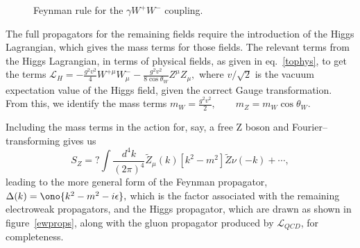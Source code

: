 \begin{figure}[htbp]
\begin{minipage}[b]{.69\textwidth}\centering\footnotesize
{}
\end{minipage}\hfill
\begin{minipage}[b]{.3\textwidth}
\caption{Feynman rule for the $\gamma W^{+}W^{-}$ coupling.}
\label{wwgam}
\end{minipage}
\end{figure}

The full propagators for the remaining fields require the introduction of the Higgs Lagrangian, which gives the mass terms for those fields. The relevant terms from the Higgs Lagrangian, in terms of physical fields, as given in eq.~\eqref{tophys}, to get the terms
\(\mathcal{L}_H=-\frac{g^2v^2}{4}W^{+\mu}W^{-}_\mu-\frac{g^2v^2}{8\cos\theta_W}Z^\mu Z_\mu,\)
where $v/\sqrt{2}$ is the vacuum expectation value of the Higgs field, given the correct Gauge transformation. From this, we identify the mass terms
\(m_W=\frac{g^2v^2}{2},\qquad m_Z=m_W\cos\theta_W.\)

Including the mass terms in the action for, say, a free Z boson and Fourier--transforming gives us
\[S_Z=?\int\frac{d^4k}{(2\pi)^4}\tilde Z_\mu(k)[k^2-m^2]\tilde Z\nu(-k) +\cdots,\]
leading to the more general form of the Feynman propagator,
\(\Delta(k)=\ono{k^2-m^2-i\epsilon},\)
which is the factor associated with the remaining electroweak propagators, and the Higgs propagator, which are drawn as shown in figure~\ref{ewprops}, along with the gluon propagator produced by $\mathcal{L}_\textit{QCD}$, for completeness.

